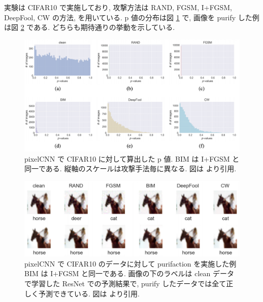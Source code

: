 実験は CIFAR10 で実施しており, 攻撃方法は RAND, FGSM, I+FGSM, DeepFool, CW の方法, を用いている.
p 値の分布は図 \ref{fig:pixeldefend-pvalue} で, 画像を purify した例は図 \ref{fig:pixeldefend-purification} である.
どちらも期待通りの挙動を示している.
%
\begin{figure}[htbp]
\begin{center}
\includegraphics[width=14.0cm]{figures/pixeldefend-pvalue.pdf}
\end{center}
\caption{
pixelCNN で CIFAR10 に対して算出した p 値.
BIM は I+FGSM と同一である.
縦軸のスケールは攻撃手法毎に異なる.
図は \cite{song2017pixeldefend} より引用.
}
\label{fig:pixeldefend-pvalue}
\end{figure}
%
\begin{figure}[htbp]
\begin{center}
\includegraphics[width=14.0cm]{figures/pixeldefend-purification.pdf}
\end{center}
\caption{
pixelCNN で CIFAR10 のデータに対して purifaction を実施した例
BIM は I+FGSM と同一である.
画像の下のラベルは clean データで学習した ResNet での予測結果で, purify したデータでは全て正しく予測できている.
図は \cite{song2017pixeldefend} より引用.
}
\label{fig:pixeldefend-purification}
\end{figure}

